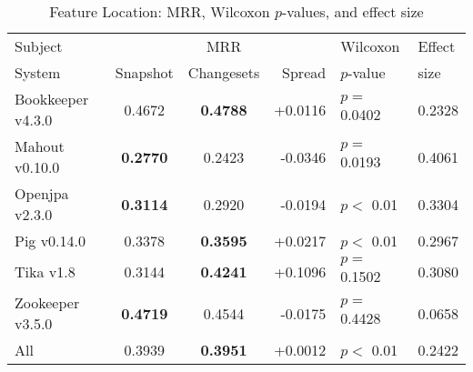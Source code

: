 \begin{table}[t]
\centering
\caption{Feature Location: MRR, Wilcoxon $p$-values, and effect size}
\begin{tabular}{l|ccr|ll}
\toprule
Subject & & MRR & & Wilcoxon & Effect \\
System  &  Snapshot & Changesets & Spread & $p$-value & size \\
\midrule
Bookkeeper v4.3.0 & 0.4672 & {\bf 0.4788 } & +0.0116 & $p = $ 0.0402 & 0.2328 \\
Mahout v0.10.0 & {\bf 0.2770 } & 0.2423 & -0.0346 & $p = $ 0.0193 & 0.4061 \\
Openjpa v2.3.0 & {\bf 0.3114 } & 0.2920 & -0.0194 & $p < $ 0.01 & 0.3304 \\
Pig v0.14.0 & 0.3378 & {\bf 0.3595 } & +0.0217 & $p < $ 0.01 & 0.2967 \\
Tika v1.8 & 0.3144 & {\bf 0.4241 } & +0.1096 & $p = $ 0.1502 & 0.3080 \\
Zookeeper v3.5.0 & {\bf 0.4719 } & 0.4544 & -0.0175 & $p = $ 0.4428 & 0.0658 \\
\midrule
All & 0.3939 & {\bf 0.3951 } & +0.0012 & $p < $ 0.01 & 0.2422 \\
\bottomrule
\end{tabular}
\label{table:feature_location_rq1}
\end{table}
